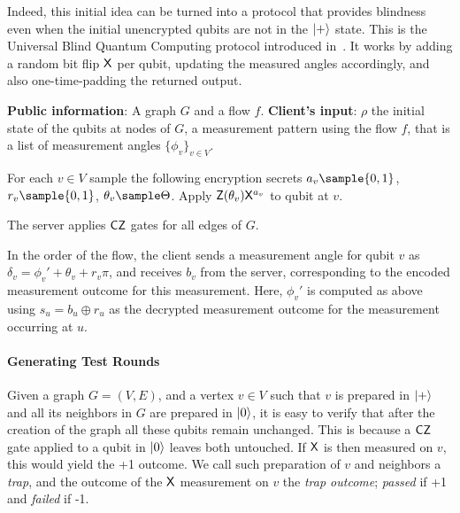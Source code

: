 Indeed, this initial idea can be turned into a protocol that provides blindness even when the initial unencrypted qubits are not in the \(\ket +\) state. This is the Universal Blind Quantum Computing protocol introduced in~\cite{BFK09universal}.  It works by adding a random bit flip \(\mathsf{X}\) per qubit, updating the measured angles accordingly, and also one-time-padding the returned output.

\begin{protocol}
  \label{proto:ubqc}
\item
  \begin{algorithmic}[0]
    \State \textbf{Public information}: A graph \(G\) and a flow \(f\).
    \State \textbf{Client's input}: \(\rho\) the initial state of the qubits at nodes of \(G\), a measurement pattern using the flow \(f\), that is a list of measurement angles \(\{\phi_{v}\}_{v\in V}\).

    \State For each \(v\in V\) sample the following encryption secrets  \(a_v \sample \{0,1\}\), \(r_v \sample \{0,1\}\), \(\theta_v \sample \Theta\).
    \State Apply \(\mathsf{Z}(\theta_{v}) \mathsf{X}^{a_{v}}\) to qubit at \(v\).
    \EndProcedure

    \State The server applies \(\mathsf{CZ}\) gates for all edges of $G$.
    \EndProcedure
    
    \State In the order of the flow, the client sends a measurement angle for qubit \(v\) as \(\delta_{v} = \phi_v' + \theta_v + r_v \pi\), and receives \(b_v\) from the server, corresponding to the encoded measurement outcome for this measurement. Here, \(\phi_v'\) is computed as above using \(s_u = b_u \oplus r_u\) as the decrypted measurement outcome for the measurement occurring at \(u\).
    \EndProcedure
  \end{algorithmic}
\end{protocol}

\paragraph{Generating Test Rounds}
\label{sec:test-rounds}
Given a graph \(G=(V,E)\), and a vertex \(v \in V\) such that \(v\) is prepared in \(\ket +\) and all its neighbors in \(G\) are prepared in \(\ket 0\), it is easy to verify that after the creation of the graph all these qubits remain unchanged. This is because a \(\mathsf{CZ}\) gate applied to a qubit in \(\ket 0\) leaves both untouched. If \(\mathsf{X}\) is then measured on \(v\), this would yield the +1 outcome. We call such preparation of \(v\) and neighbors a \emph{trap}, and the outcome of the \(\mathsf{X}\) measurement on \(v\) the \emph{trap outcome}; \emph{passed} if +1 and \emph{failed} if -1. 

